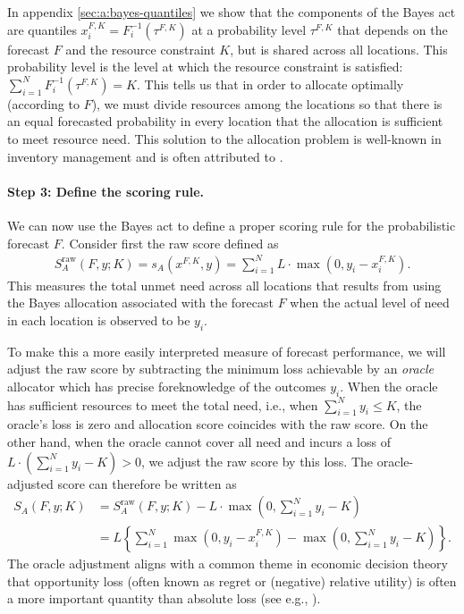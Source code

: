 \documentclass{article}
\begin{document}
In appendix \ref{sec:a:bayes-quantiles} we show that the components of the Bayes act are quantiles 
$x_i^{F,K} = F_i^{-1}(\tau^{F,K})$ at a probability level $\tau^{F,K}$ that depends on the forecast $F$ and the resource
constraint $K$, but is shared across all locations. This probability level is the level at which the resource constraint
is satisfied: $\sum_{i=1}^N F_i^{-1}(\tau^{F,K}) = K$. This tells us that in order to allocate optimally (according to
$F$), we must divide resources among the locations so that there is an equal forecasted probability in every location
that the allocation is sufficient to meet resource need. This solution to the allocation problem is well-known in
inventory management and is often attributed to \cite{hadleywhitin1963}.

\paragraph{Step 3: Define the scoring rule.} We can now use the Bayes act to define a proper scoring rule for the
probabilistic forecast $F$. Consider first the raw score defined as
\begin{align}
  S_A^{\text{raw}}(F, y; K) = s_A(x^{F,K}, y) = \sum_{i=1}^N L \cdot \max(0, y_i - x_i^{F,K}). \label{eqn:AS-raw}
\end{align}
This measures the total unmet need across all locations that results from using the Bayes allocation associated with the
forecast $F$ when the actual level of need in each location is observed to be $y_i$.

To make this a more easily interpreted measure of forecast performance, we will adjust the raw score by subtracting the
minimum loss achievable by an \emph{oracle} allocator which has precise foreknowledge of the outcomes $y_i$. When the
oracle has sufficient resources to meet the total need, i.e., when $\sum_{i=1}^{N}y_i \leq K$, the oracle's loss is zero
and allocation score coincides with the raw score. On the other hand, when the oracle cannot cover all need and incurs a
loss of $L \cdot \left(\sum_{i=1}^{N}y_i - K \right) > 0$, we adjust the raw score by this loss.
The oracle-adjusted score can therefore be written as
\begin{align}
  S_A(F, y; K)  &= S_A^{\text{raw}}(F, y; K) - L \cdot \max\left(0,\sum_{i=1}^{N}y_i - K\right) \\
  &= L\left\{\sum_{i=1}^N \max(0, y_i - x_i^{F,K}) -  \max\left(0,\sum_{i=1}^{N}y_i - K\right)\right\}. \label{eqn:AS-orc}
\end{align}
The oracle adjustment aligns with a common theme in economic decision theory that opportunity loss (often known
as regret or (negative) relative utility) is often a more important quantity than absolute loss (see e.g.,
\cite{DIECIDUE201788}).
\end{document}
